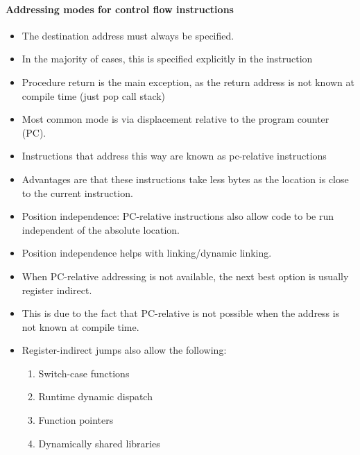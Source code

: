\paragraph{Addressing modes for control flow instructions}
\begin{itemize}
  \item The destination address must always be specified.
  \item In the majority of cases, this is specified explicitly in the instruction
  \item Procedure return is the main exception, as the return address is not known at compile time (just pop call stack)
  \item Most common mode is via displacement relative to the program counter (PC). 
  \item Instructions that address this way are known as pc-relative instructions 
  \item Advantages are that these instructions take less bytes as the location is close to the current instruction.
  \item Position independence: PC-relative instructions also allow code to be run independent of the absolute location.
  \item Position independence helps with linking/dynamic linking.
  \item When PC-relative addressing is not available, the next best option is usually register indirect.
  \item This is due to the fact that PC-relative is not possible when the address is not known at compile time. 
  \item Register-indirect jumps also allow the following:
  \begin{enumerate}
    \item Switch-case functions
    \item Runtime dynamic dispatch
    \item Function pointers 
    \item Dynamically shared libraries
  \end{enumerate}
\end{itemize}
